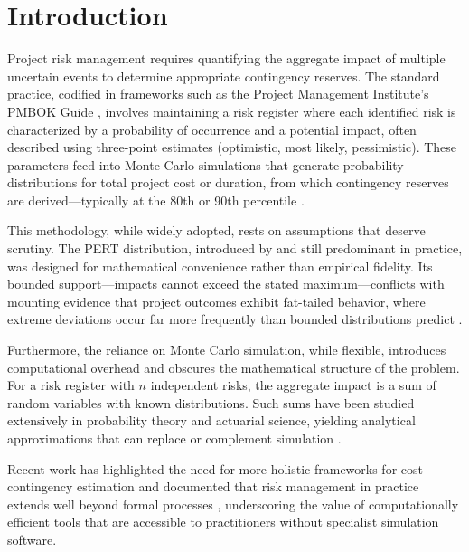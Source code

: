 \documentclass[12pt,a4paper]{article}
\theoremstyle{definition}
\theoremstyle{remark}
\begin{document}
\section{Introduction}
\label{sec:introduction}

Project risk management requires quantifying the aggregate impact of multiple uncertain events to determine appropriate contingency reserves. The standard practice, codified in frameworks such as the Project Management Institute's PMBOK Guide \citep{PMI2021}, involves maintaining a risk register where each identified risk is characterized by a probability of occurrence and a potential impact, often described using three-point estimates (optimistic, most likely, pessimistic). These parameters feed into Monte Carlo simulations that generate probability distributions for total project cost or duration, from which contingency reserves are derived—typically at the 80th or 90th percentile \citep{Vose2008}.

This methodology, while widely adopted, rests on assumptions that deserve scrutiny. The PERT distribution, introduced by \citet{Clark1962} and still predominant in practice, was designed for mathematical convenience rather than empirical fidelity. Its bounded support—impacts cannot exceed the stated maximum—conflicts with mounting evidence that project outcomes exhibit fat-tailed behavior, where extreme deviations occur far more frequently than bounded distributions predict \citep{Flyvbjerg2011, Flyvbjerg2021}.

Furthermore, the reliance on Monte Carlo simulation, while flexible, introduces computational overhead and obscures the mathematical structure of the problem. For a risk register with $n$ independent risks, the aggregate impact is a sum of random variables with known distributions. Such sums have been studied extensively in probability theory and actuarial science, yielding analytical approximations that can replace or complement simulation \citep{Embrechts1997}.

Recent work has highlighted the need for more holistic frameworks for cost contingency estimation \citep{Zhang2025} and documented that risk management in practice extends well beyond formal processes \citep{Willumsen2024}, underscoring the value of computationally efficient tools that are accessible to practitioners without specialist simulation software.
\end{document}
